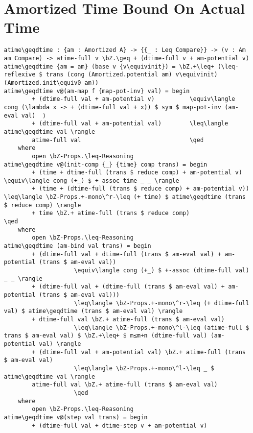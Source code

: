 \newpage
\section{Amortized Time Bound On Actual Time}
\label{sec:atime-proof}
\begin{lstlisting}[caption={Amortized time bounds actual time from above},label={lst:appendix:atime-proof}]
atime\geqdtime : {am : Amortized A} -> {{_ : Leq Compare}} -> (v : Am am Compare) -> atime-full v \bZ.\geq + (dtime-full v + am-potential v)
atime\geqdtime {am = am} (base v {v\equivinit}) = \bZ.+\leq+ (\leq-reflexive $ trans (cong (Amortized.potential am) v\equivinit) (Amortized.init\equiv0 am))
atime\geqdtime v@(am-map f {map-pot-inv} val) = begin
        + (dtime-full val + am-potential v)          \equiv\langle cong (\lambda x -> + (dtime-full val + x)) $ sym $ map-pot-inv (am-eval val)  ⟩
        + (dtime-full val + am-potential val)        \leq\langle atime\geqdtime val \rangle
        atime-full val                               \qed
    where
        open \bZ-Props.\leq-Reasoning
atime\geqdtime v@(init-comp {_} {time} comp trans) = begin
        + (time + dtime-full (trans $ reduce comp) + am-potential v)     \equiv\langle cong (+_) $ +-assoc time _ _ \rangle
        + (time + (dtime-full (trans $ reduce comp) + am-potential v))   \leq\langle \bZ-Props.+-mono\^r-\leq (+ time) $ atime\geqdtime (trans $ reduce comp) \rangle
        + time \bZ.+ atime-full (trans $ reduce comp)                      \qed
    where
        open \bZ-Props.\leq-Reasoning
atime\geqdtime (am-bind val trans) = begin
        + (dtime-full val + dtime-full (trans $ am-eval val) + am-potential (trans $ am-eval val))
                    \equiv\langle cong (+_) $ +-assoc (dtime-full val) _ _ \rangle
        + (dtime-full val + (dtime-full (trans $ am-eval val) + am-potential (trans $ am-eval val)))
                    \leq\langle \bZ-Props.+-mono\^r-\leq (+ dtime-full val) $ atime\geqdtime (trans $ am-eval val) \rangle
        + dtime-full val \bZ.+ atime-full (trans $ am-eval val)
                    \leq\langle \bZ-Props.+-mono\^l-\leq (atime-full $ trans $ am-eval val) $ \bZ.+\leq+ $ m≤m+n (dtime-full val) (am-potential val) \rangle
        + (dtime-full val + am-potential val) \bZ.+ atime-full (trans $ am-eval val)
                    \leq\langle \bZ-Props.+-mono\^l-\leq _ $ atime\geqdtime val \rangle
        atime-full val \bZ.+ atime-full (trans $ am-eval val)
                    \qed
    where
        open \bZ-Props.\leq-Reasoning
atime\geqdtime v@(step val trans) = begin
        + (dtime-full val + dtime-step v + am-potential v)


\end{lstlisting}
